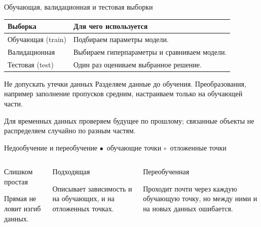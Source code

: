\begin{frame}{Обучающая, валидационная и тестовая выборки}
  \begin{tabularx}{\linewidth}{@{}l Y@{}}
    \toprule
    \textbf{Выборка} & \textbf{Для чего используется}\\
    \midrule
    Обучающая (train) & Подбираем параметры модели.\\
    Валидационная & Выбираем гиперпараметры и сравниваем модели.\\
    Тестовая (test) & Один раз оцениваем выбранное решение.\\
    \bottomrule
  \end{tabularx}\par
  \begin{block}{Не допускать утечки данных}
    Разделяем данные до обучения. Преобразования, например заполнение пропусков средним, настраиваем только на обучающей части.
  \end{block}
  Для временных данных проверяем будущее по прошлому; связанные объекты не распределяем случайно по разным частям.
\end{frame}

\begin{frame}[c]{Недообучение и переобучение}
  \footnotesize\color{acGray}
  \textcolor{acOrange}{$\bullet$}~обучающие точки \qquad $\circ$~отложенные точки

  \smallskip
  \begin{columns}[T]
    \begin{column}{0.31\textwidth}
      \begin{block}{Слишком простая}
        \centering\par
        Прямая не ловит изгиб данных.
      \end{block}
    \end{column}
    \begin{column}{0.31\textwidth}
      \begin{block}{Подходящая}
        \centering\par
        Описывает зависимость и на обучающих, и на отложенных точках.
      \end{block}
    \end{column}
    \begin{column}{0.31\textwidth}
      \begin{block}{Переобученная}
        \centering\par
        Проходит почти через каждую обучающую точку, но между ними и на новых данных ошибается.
      \end{block}
    \end{column}
  \end{columns}
\end{frame}

